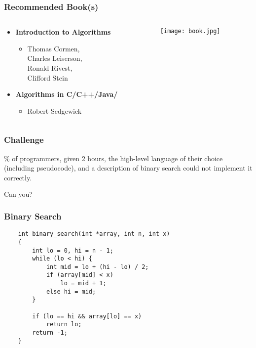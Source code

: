 \documentclass[svgnames,dvipsnames,usenames]{beamer}
\begin{document}
\begin{frame}
    \frametitle{Recommended Book(s)}
    \begin{columns}[t]
        \begin{column}[T]{5cm}
            \begin{itemize}
                \item \textbf{Introduction to Algorithms}
                    \begin{itemize}
                        \item Thomas Cormen,\\ Charles Leiserson,\\ Ronald Rivest,\\ Clifford Stein
                    \end{itemize}
                \item \textbf{Algorithms in C/C++/Java/}
                    \begin{itemize}
                        \item Robert Sedgewick
                    \end{itemize}
            \end{itemize}
        \end{column}
        \begin{column}[T]{5cm}
            \texttt{[image: book.jpg]}
        \end{column}
    \end{columns}
\end{frame}


\begin{frame}
    \frametitle{Challenge}
    \% of programmers, given 2 hours, the high-level language of their choice (including pseudocode), and a description of binary search could not implement it correctly.

    \vspace{15mm}
    \pause
    Can you?
\end{frame}

\begin{frame}[fragile]
    \frametitle{Binary Search}
    \begin{lstlisting}
    int binary_search(int *array, int n, int x)
    {
        int lo = 0, hi = n - 1;
        while (lo < hi) {
            int mid = lo + (hi - lo) / 2;
            if (array[mid] < x)
                lo = mid + 1;
            else hi = mid;
        }

        if (lo == hi && array[lo] == x)
            return lo;
        return -1;
    }
    \end{lstlisting}
\end{frame}
\end{document}
